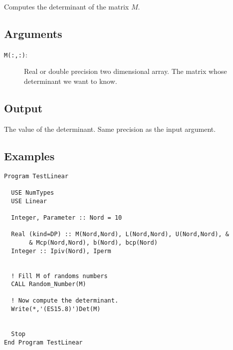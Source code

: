 Computes the determinant of the matrix $M$.

\subsection{Arguments}

\begin{description}
\item[\texttt{M(:,:)}: ] Real or double precision two dimensional
  array. The matrix whose determinant we want to know.
\end{description}

\subsection{Output}

The value of the determinant. Same precision as the input argument.

\subsection{Examples}

\begin{lstlisting}[emph=Det,
                   emphstyle=\color{blue},
                   frame=trBL,
                   caption=Computing the determinant of a matrix.,
                   label=det]
Program TestLinear

  USE NumTypes
  USE Linear

  Integer, Parameter :: Nord = 10

  Real (kind=DP) :: M(Nord,Nord), L(Nord,Nord), U(Nord,Nord), &
       & Mcp(Nord,Nord), b(Nord), bcp(Nord)
  Integer :: Ipiv(Nord), Iperm


  ! Fill M of randoms numbers
  CALL Random_Number(M)

  ! Now compute the determinant.
  Write(*,'(ES15.8)')Det(M)


  Stop
End Program TestLinear
\end{lstlisting}


